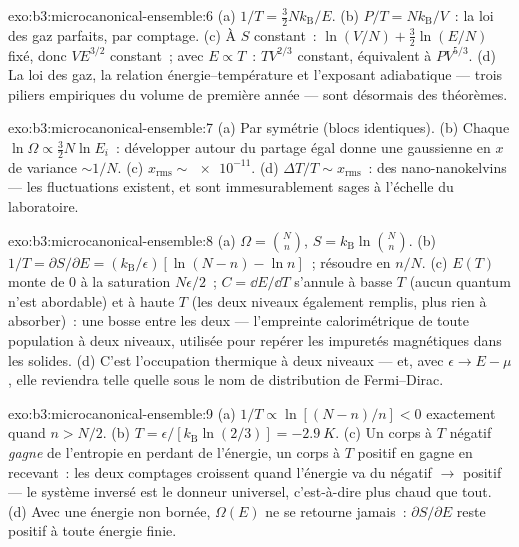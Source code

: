 \begin{solution}{exo:b3:microcanonical-ensemble:6}
(a) $1/T = \tfrac32 Nk_{\text{B}}/E$. (b) $P/T =
Nk_{\text{B}}/V$~: la loi des gaz parfaits, par comptage. (c) À $S$
constant~: $\ln(V/N) + \tfrac32\ln(E/N)$ fixé, donc $VE^{3/2}$
constant~; avec $E \propto T$~: $TV^{2/3}$ constant, équivalent à
$PV^{5/3}$. (d) La loi des gaz, la relation énergie--température et
l'exposant adiabatique --- trois piliers empiriques du volume de
première année --- sont désormais des théorèmes.
\end{solution}

\begin{solution}{exo:b3:microcanonical-ensemble:7}
(a) Par symétrie (blocs identiques). (b) Chaque $\ln\Omega \propto
\tfrac32 N\ln E_i$~: développer autour du partage égal donne une
gaussienne en $x$ de variance $\sim1/N$. (c) $x_{\text{rms}} \sim
\num{e-11}$. (d) $\Delta T/T \sim x_{\text{rms}}$~: des
nano-nanokelvins --- les fluctuations existent, et sont
immesurablement sages à l'échelle du laboratoire.
\end{solution}

\begin{solution}{exo:b3:microcanonical-ensemble:8}
(a) $\Omega = \binom Nn$, $S = k_{\text{B}}\ln\binom Nn$. (b)
$1/T = \partial S/\partial E = (k_{\text{B}}/\epsilon)[\ln(N-n) -
\ln n]$~; résoudre en $n/N$. (c) $E(T)$ monte de $0$ à la
saturation $N\epsilon/2$~; $C = \dd E/\dd T$ s'annule à basse $T$
(aucun quantum n'est abordable) et à haute $T$ (les deux niveaux
également remplis, plus rien à absorber)~: une bosse entre les deux
--- l'empreinte calorimétrique de toute population à deux niveaux,
utilisée pour repérer les impuretés magnétiques dans les solides. (d)
C'est l'occupation thermique à deux niveaux --- et, avec
$\epsilon \to E - \mu$, elle reviendra telle quelle sous le nom de
distribution de Fermi--Dirac.
\end{solution}

\begin{solution}{exo:b3:microcanonical-ensemble:9}
(a) $1/T \propto \ln[(N-n)/n] < 0$ exactement quand $n > N/2$. (b)
$T = \epsilon/[k_{\text{B}}\ln(2/3)] = -\qty{2.9}{K}$. (c) Un corps à
$T$ négatif \emph{gagne} de l'entropie en perdant de l'énergie, un
corps à $T$ positif en gagne en recevant~: les deux comptages
croissent quand l'énergie va du négatif $\to$ positif --- le système
inversé est le donneur universel, c'est-à-dire plus chaud que tout.
(d) Avec une énergie non bornée, $\Omega(E)$ ne se retourne jamais~:
$\partial S/\partial E$ reste positif à toute énergie finie.
\end{solution}

